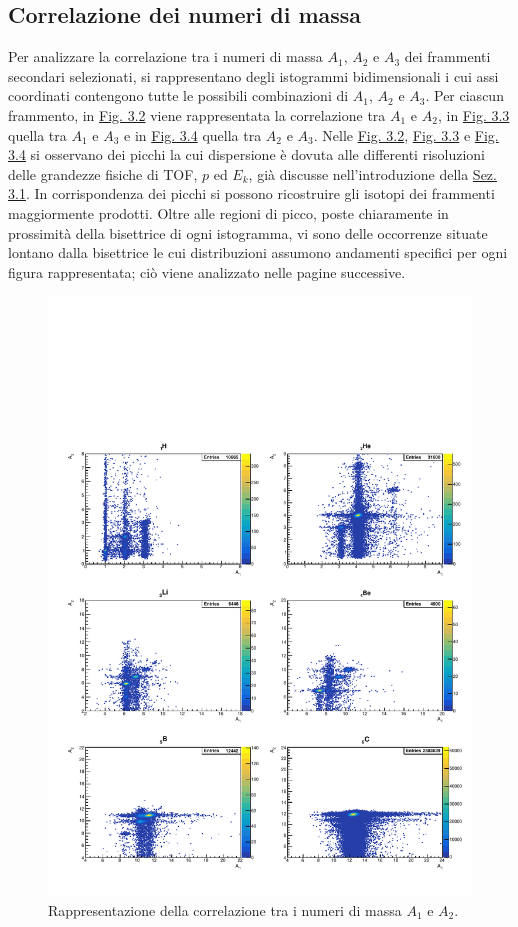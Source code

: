 \documentclass[12pt,a4paper,twoside]{report}
\begin{document}
	\subsection{Correlazione dei numeri di massa}\label{sec:correlation_number_mass}
	Per analizzare la correlazione tra i numeri di massa $A_1$, $A_2$ e $A_3$ dei frammenti secondari selezionati, si rappresentano degli istogrammi bidimensionali i cui assi coordinati contengono tutte le possibili combinazioni di $A_1$, $A_2$ e $A_3$. Per ciascun frammento, in \hyperref[fig:a1]{Fig. 3.2} viene rappresentata la correlazione tra $A_1$ e $A_2$, in \hyperref[fig:a2]{Fig. 3.3} quella tra $A_1$ e $A_3$ e in \hyperref[fig:a3]{Fig. 3.4} quella tra $A_2$ e $A_3$. Nelle \hyperref[fig:a1]{Fig. 3.2}, \hyperref[fig:a2]{Fig. 3.3} e \hyperref[fig:a3]{Fig. 3.4} si osservano dei picchi la cui dispersione è dovuta alle differenti risoluzioni delle grandezze fisiche di TOF, $p$ ed $E_k$, già discusse nell'introduzione della \hyperref[sec:fragment_identification]{Sez. 3.1}. In corrispondenza dei picchi si possono ricostruire gli isotopi dei frammenti maggiormente prodotti. Oltre alle regioni di picco, poste chiaramente in prossimità della bisettrice di ogni istogramma, vi sono delle occorrenze situate lontano dalla bisettrice le cui distribuzioni assumono andamenti specifici per ogni figura rappresentata; ciò viene analizzato nelle pagine successive.
	\begin{figure}[H]
		\centering
		\includegraphics[width=1.\linewidth]{c_MultiCanvas1.pdf}
		\caption{Rappresentazione della correlazione tra i numeri di massa $A_1$ e $A_2$.}
		\label{fig:a1}
	\end{figure}
\end{document}
